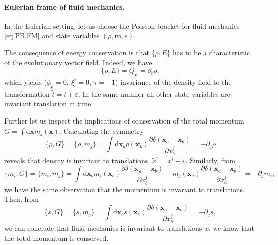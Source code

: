 \documentclass[
10pt, %
a4paper, %
oneside, %
headinclude,footinclude, %
BCOR5mm, %
]{scrartcl}
\newcommand{\xx}{\mathbf{x}}
\newcommand{\dx}{\mathrm{d}\xx}
\newcommand{\mm}{\mathbf{m}}
\newcommand{\Gfunc}{G}
\begin{document}
\paragraph{Eulerian frame of fluid mechanics.}
In the Eulerian setting, let us choose the Poisson bracket for fluid mechanics \eqref{eq.PB.FM} and state variables $(\rho,\mm,s)$. 

The consequence of energy conservation is that $\{\rho,E\}$ has to be a characteristic of the 
evolutionary vector field. Indeed, we have
\begin{equation*}
    \{\rho,E\}=Q_\rho= \partial_t \rho,
\end{equation*}
which yields ($\phi_\rho=0,~\xi^i=0,~\tau=-1$) invariance of the density field 
to the transformation $\tilde{t} = t+ \varepsilon$. In the same manner all 
other state variables are invariant translation in time.

Further let us inspect the implications of conservation of the total momentum 
$\Gfunc=\int\dx m_j(\xx)$. Calculating the symmetry 
\begin{equation*}
    \{\rho,\Gfunc\} = \{\rho,m_j\} = \int \dx _b \rho(\xx_b) \frac{\partial 
    \delta(\xx_a-\xx_b)}{\partial x_b^j} = -\partial_j \rho
\end{equation*}
reveals that density is invariant to translations, $\tilde{x}^i = x^i + 
\varepsilon$. Similarly, from
\begin{equation*}
    \{m_i,\Gfunc\} = \{m_i,m_j\} = \int \dx_b m_i(\xx_b) \frac{\partial 
    \delta(\xx_a-\xx_b)}{\partial x_b^j} - m_j(\xx_a) \frac{\partial 
    \delta(\xx_a-\xx_b)}{\partial x_a^j} = -\partial_j m_i,
\end{equation*}
we have the same observation that the momentum is invariant to translations. Then, from
\begin{equation*}
    \{s,\Gfunc\} = \{s,m_j\} = \int \dx_b s(\xx_b) \frac{\partial 
    \delta(\xx_a-\xx_b)}{\partial x_b^j} = -\partial_j s,
\end{equation*}
we can conclude that fluid mechanics is invariant to translations as we know that the total 
momentum is conserved.
\end{document}
